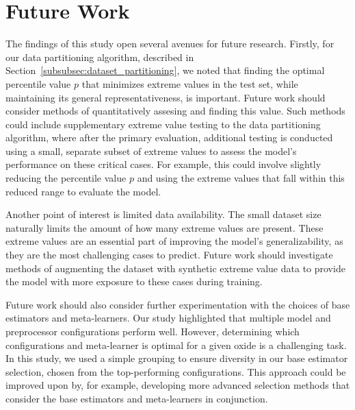 \section{Future Work}\label{sec:future_work}
The findings of this study open several avenues for future research.
Firstly, for our data partitioning algorithm, described in Section~\ref{subsubsec:dataset_partitioning}, we noted that finding the optimal percentile value $p$ that minimizes extreme values in the test set, while maintaining its general representativeness, is important.
Future work should consider methods of quantitatively assesing and finding this value.
Such methods could include supplementary extreme value testing to the data partitioning algorithm, where after the primary evaluation, additional testing is conducted using a small, separate subset of extreme values to assess the model's performance on these critical cases.
For example, this could involve slightly reducing the percentile value $p$ and using the extreme values that fall within this reduced range to evaluate the model.

Another point of interest is limited data availability.
The small dataset size naturally limits the amount of how many extreme values are present.
These extreme values are an essential part of improving the model's generalizability, as they are the most challenging cases to predict.
Future work should investigate methods of augmenting the dataset with synthetic extreme value data to provide the model with more exposure to these cases during training.

Future work should also consider further experimentation with the choices of base estimators and meta-learners.
Our study highlighted that multiple model and preprocessor configurations perform well.
However, determining which configurations and meta-learner is optimal for a given oxide is a challenging task.
In this study, we used a simple grouping to ensure diversity in our base estimator selection, chosen from the top-performing configurations.
This approach could be improved upon by, for example, developing more advanced selection methods that consider the base estimators and meta-learners in conjunction. 